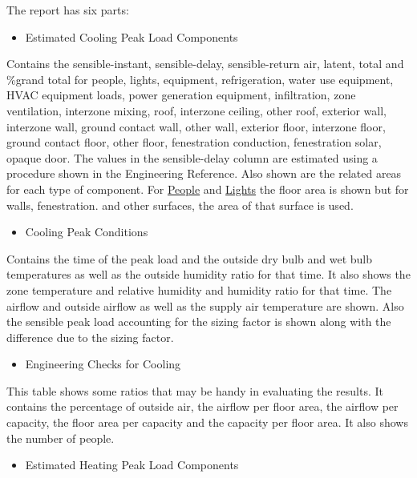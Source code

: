The report has six parts:

\begin{itemize}
\tightlist
\item
  Estimated Cooling Peak Load Components
\end{itemize}

Contains the sensible-instant, sensible-delay, sensible-return air, latent, total and \%grand total for people, lights, equipment, refrigeration, water use equipment, HVAC equipment loads, power generation equipment, infiltration, zone ventilation, interzone mixing, roof, interzone ceiling, other roof, exterior wall, interzone wall, ground contact wall, other wall, exterior floor, interzone floor, ground contact floor, other floor, fenestration conduction, fenestration solar, opaque door. The values in the sensible-delay column are estimated using a procedure shown in the Engineering Reference. Also shown are the related areas for each type of component. For \hyperref[people]{People} and \hyperref[lights-000]{Lights} the floor area is shown but for walls, fenestration. and other surfaces, the area of that surface is used.

\begin{itemize}
\tightlist
\item
  Cooling Peak Conditions
\end{itemize}

Contains the time of the peak load and the outside dry bulb and wet bulb temperatures as well as the outside humidity ratio for that time. It also shows the zone temperature and relative humidity and humidity ratio for that time. The airflow and outside airflow as well as the supply air temperature are shown. Also the sensible peak load accounting for the sizing factor is shown along with the difference due to the sizing factor.

\begin{itemize}
\tightlist
\item
  Engineering Checks for Cooling
\end{itemize}

This table shows some ratios that may be handy in evaluating the results. It contains the percentage of outside air, the airflow per floor area, the airflow per capacity, the floor area per capacity and the capacity per floor area. It also shows the number of people.


\begin{itemize}
\tightlist
\item
  Estimated Heating Peak Load Components
\end{itemize}

